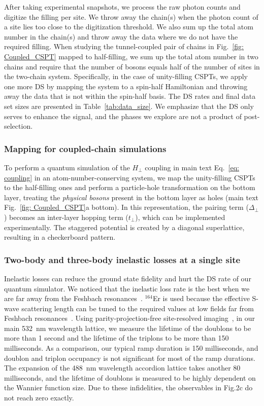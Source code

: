 \documentclass[preprint,superscriptaddress,floatfix, nofootinbib]{revtex4-2}
\begin{document}
After taking experimental snapshots, we process the raw photon counts and digitize the filling per site. We throw away the chain(s) when the photon count of a site lies too close to the digitization threshold. We also sum up the total atom number in the chain(s) and throw away the data where we do not have the required filling. When studying the tunnel-coupled pair of chains in Fig.~\ref{fig: Coupled_CSPT} mapped to half-filling, we sum up the total atom number in two chains and require that the number of bosons equals half of the number of sites in the two-chain system. Specifically, in the case of unity-filling CSPTs, we apply one more DS by mapping the system to a spin-half Hamiltonian and throwing away the data that is not within the spin-half basis. The DS rates and final data set sizes are presented in Table~\ref{tab:data_size}. We emphasize that the DS only serves to enhance the signal, and the phases we explore are not a product of post-selection.

\subsubsection*{Mapping for coupled-chain simulations}

To perform a quantum simulation of the $H_\perp$ coupling in main text Eq.~\eqref{eq: coupling} in an atom-number-conserving system, we map the unity-filling CSPTs to the half-filling ones and perform a particle-hole transformation on the bottom layer, treating the \textit{physical bosons} present in the bottom layer as holes (main text Fig.~\ref{fig: Coupled_CSPT}a bottom).
%
In this representation, the pairing term ($\Delta_\perp$) becomes an inter-layer hopping term ($t_\perp$), which can be implemented experimentally. The staggered potential is created by a diagonal superlattice, resulting in a checkerboard pattern.

\subsubsection*{Two-body and three-body inelastic losses at a single site}

Inelastic losses can reduce the ground state fidelity and hurt the DS rate of our quantum simulator. We noticed that the inelastic loss rate is the best when we are far away from the Feshbach resonances~\cite{Chin2010, Frisch2014}. $^{164}$Er is used because the effective S-wave scattering length can be tuned to the required values at low fields far from Feshbach resonances~\cite{Patscheider2022}. Using parity-projection-free site-resolved imaging~\cite{Su2024}, in our main 532~nm wavelength lattice, we measure the lifetime of the doublons to be more than 1 second and the lifetime of the triplons to be more than 150 milliseconds. As a comparison, our typical ramp duration is 150 milliseconds, and doublon and triplon occupancy is not significant for most of the ramp durations. The expansion of the 488~nm wavelength accordion lattice takes another 80 milliseconds, and the lifetime of doublons is measured to be highly dependent on the Wannier function size. Due to these infidelities, the observables in Fig.2c do not reach zero exactly.
\end{document}
